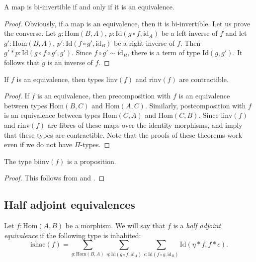 \documentclass[reqno]{amsart}
\theoremstyle{definition}
\theoremstyle{remark}
\newcommand{\fs}[1]{\mathrm{#1}}
\newcommand{\Hom}{\fs{Hom}}
\newcommand{\Id}{\fs{Id}}
\newcommand{\id}{\fs{id}}
\numberwithin{figure}{section}
\begin{document}
\begin{prop}
A map is bi-invertible if and only if it is an equivalence.
\end{prop}
\begin{proof}
Obviously, if a map is an equivalence, then it is bi-invertible.
Let us prove the converse.
Let $g : \Hom(B,A)$, $p : \Id(g \circ f, \id_A)$ be a left inverse of $f$ and let $g' : \Hom(B,A)$, $p' : \Id(f \circ g', \id_B)$ be a right inverse of $f$.
Then $g' * p : \Id(g \circ f \circ g', g')$.
Since $f \circ g' \sim \id_B$, there is a term of type $\Id(g,g')$.
It follows that $g$ is an inverse of $f$.
\end{proof}

\begin{lem}
If $f$ is an equivalence, then types $\fs{linv}(f)$ and $\fs{rinv}(f)$ are contractible.
\end{lem}
\begin{proof}
If $f$ is an equivalence, then precomposition with $f$ is an equivalence between types $\Hom(B,C)$ and $\Hom(A,C)$.
Similarly, postcomposition with $f$ is an equivalence between types $\Hom(C,A)$ and $\Hom(C,B)$.
Since $\fs{linv}(f)$ and $\fs{rinv}(f)$ are fibres of these maps over the identity morphisms, \cite[Theorem~4.2.3]{hottbook} and \cite[Theorem~4.2.6]{hottbook} imply that these types are contractible.
Note that the proofs of these theorems work even if we do not have $\Pi$-types.
\end{proof}

\begin{prop}
The type $\fs{biinv}(f)$ is a proposition.
\end{prop}
\begin{proof}
This follows from  and .
\end{proof}

\subsection{Half adjoint equivalences}

Let $f : \Hom(A,B)$ be a morphism.
We will say that $f$ is a \emph{half adjoint equivalence} if the following type is inhabited:
\[ \fs{ishae}(f) = \sum_{g : \Hom(B,A)} \sum_{\eta : \Id(g \circ f, \id_A)} \sum_{\epsilon : \Id(f \circ g, \id_B)} \Id(\eta * f, f * \epsilon). \]
\end{document}
